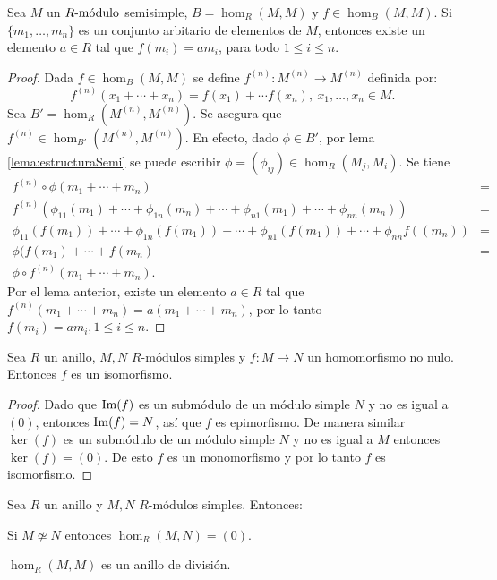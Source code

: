 \begin{teorema}
Sea $M$ un $\modulo{R}$ semisimple, $B= \hom_R(M,M)$ y $f \in  \hom_B(M,M)$. Si $\{ m_1, \dots, m_n \}$ es un conjunto arbitario de elementos de $M$, entonces existe un elemento $a \in R$ tal que $f(m_i) = am_i$, para todo $1\leq i \leq n$.
\end{teorema}
\begin{proof}
Dada $f \in \hom_B(M,M)$ se define $f^{(n)} \colon M^{(n)} \to M^{(n)}$ definida por: \[ f^{(n)}(x_1 + \cdots + x_n) = f(x_1) + \cdots f(x_n), \ x_1, \dots, x_n \in M. \]
Sea $B' = \hom_R(M^{(n)}, M^{(n)})$. Se asegura que $f^{(n)} \in \hom_{B'}(M^{(n)}, M^{(n)})$. En efecto, dado $\phi \in B'$, por lema \ref{lema:estructuraSemi} se puede escribir $\phi = (\phi_{ij}) \in \hom_R(M_j,M_i)$. Se tiene
\begin{eqnarray*}
f^{(n)} \circ \phi(m_1+\cdots +m_n) &=& \\ 
f^{(n)}(\phi_{11}(m_1) +\cdots+\phi_{1n}(m_n)+\cdots+\phi_{n1}(m_1)+\cdots+\phi_{nn}(m_n)) &=& \\
\phi_{11}(f(m_1)) + \cdots + \phi_{1n}(f(m_1)) + \cdots + \phi_{n1}(f(m_1 )) + \cdots + \phi_{nn}f((m_n)) &=&  \\
\phi(f(m_1) + \cdots + f(m_n) &=& \\
\phi \circ f^{(n)}(m_1 + \cdots + m_n).
\end{eqnarray*}
Por el lema anterior, existe un elemento $a \in R$ tal que $f^{(n)}(m_1+\cdots+m_n) = a(m_1+\cdots+m_n)$, por lo tanto $f(m_i) = am_i, 1\leq i \leq n$.
\end{proof}
\begin{lema}
Sea $R$ un anillo, $M,N$ $R\mbox{-módulos}$ simples y $f \colon M \to N$ un homomorfismo no nulo. Entonces $f$ es un isomorfismo.
\end{lema}
\begin{proof}
Dado que $\Ima(f)$ es un submódulo de un módulo simple $N$ y no es igual a $(0)$, entonces $\Ima(f) = N$, así que $f$ es epimorfismo. De manera similar $\ker(f)$ es un submódulo de un módulo simple $N$ y no es igual a $M$ entonces $\ker(f) = (0)$. De esto $f$ es un monomorfismo y por lo tanto $f$ es isomorfismo.
\end{proof}
\begin{corolario}
Sea $R$ un anillo y $M,N$ $R\mbox{-módulos}$ simples. Entonces:
\begin{bulletList}
\item Si $M \not\simeq N$ entonces $\hom_R(M,N) = (0)$.
\item $\hom_R(M,M)$ es un anillo de división. 
\end{bulletList}
\end{corolario}
